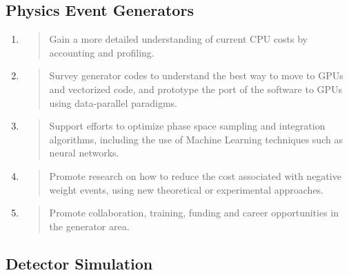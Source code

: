 \documentclass[10pt,a4paper]{article}
\begin{document}
\hypertarget{physics-event-generators-1}{%
\subsection{Physics Event Generators}\label{physics-event-generators-1}}

\begin{enumerate}
\def\labelenumi{\arabic{enumi}.}
\item
  \begin{quote}
  Gain a more detailed understanding of current CPU costs by accounting
  and profiling.
  \end{quote}
\item
  \begin{quote}
  Survey generator codes to understand the best way to move to GPUs and
  vectorized code, and prototype the port of the software to GPUs using
  data-parallel paradigms.
  \end{quote}
\item
  \begin{quote}
  Support efforts to optimize phase space sampling and integration
  algorithms, including the use of Machine Learning techniques such as
  neural networks.
  \end{quote}
\item
  \begin{quote}
  Promote research on how to reduce the cost associated with negative
  weight events, using new theoretical or experimental approaches.
  \end{quote}
\item
  \begin{quote}
  Promote collaboration, training, funding and career opportunities in
  the generator area.
  \end{quote}
\end{enumerate}

\hypertarget{detector-simulation-1}{%
\subsection{Detector Simulation}\label{detector-simulation-1}}
\end{document}
